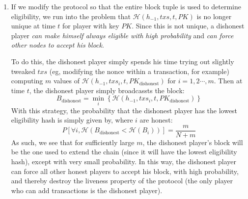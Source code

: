 \documentclass[12pt]{exam}
\begin{document}
\begin{questions}
\begin{solution}
\begin{enumerate}[label=\textbf{\alph*.}]
    \item
      If we modify the protocol so that the entire block tuple is used to determine eligibility, we run into the problem that $\mathcal{H}(h_{-1}, txs, t, PK)$ is no longer unique at time $t$ for player with key $PK$. Since this is not unique, a dishonest player \textit{can make himself always eligible with high probability} and \textit{can force other nodes to accept his block}.

      To do this, the dishonest player simply spends his time trying out slightly tweaked $txs$ (eg, modifying the nonce within a transaction, for example) computing $m$ values of $\mathcal{H}(h_{-1}, txs_i, t, PK_{\text{dishonest}})$ for $i = 1, 2 \cdots, m$. Then at time $t$, the dishonest player simply broadcassts the block:
      \[
        B_{\text{dishonest}} = \min_i \left\{\mathcal{H}(h_{-1}, txs_i, t, PK_{\text{dishonest}})  \right\}
      \]
      With this strategy, the probability that the dishonest player has the lowest eligibility hash is simply given by, where $i$ are honest:
      \[
        P[\forall i, \mathcal{H}(B_{\text{dishonest}} < \mathcal{H}(B_i))] = \frac{m}{N+m}
      \]
      As such, we see that for sufficiently large $m$, the dishonest player's block will be the one used to extend the chain (since it will have the lowest eligibility hash), except with very small probability. In this way, the dishonest player can force all other honest players to accept his block, with high probability, and thereby destroy the liveness property of the protocol (the only player who can add transactions is the dishonest player).


\end{enumerate}
\end{solution}
\end{questions}
\end{document}
